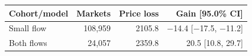 \begin{tabular}{lrrr}
\toprule
Cohort/model & Markets & Price loss & Gain [95.0\% CI] \\
\midrule
Small flow & 108,959 & 2105.8 & \ensuremath{-}14.4 [\ensuremath{-}17.5, \ensuremath{-}11.2] \\
Both flows & 24,057 & 2359.8 & 20.5 [10.8, 29.7] \\
\bottomrule
\end{tabular}
